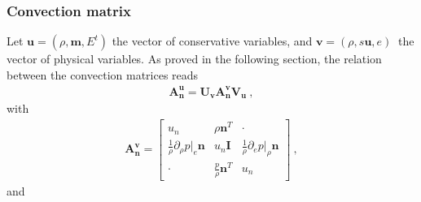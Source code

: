 \documentclass[letterpaper,10pt,english]{jupyterBook}
\begin{document}
\subsubsection*{Convection matrix}

\sphinxAtStartPar
Let \(\mathbf{u} = ( \rho, \mathbf{m}, E^t )\) the vector of conservative variables, and \(\mathbf{v} = ( \rho, s\mathbf{u} , e ) \ \) the vector of physical variables. As proved in the following section, the relation between the convection matrices reads
\begin{equation*}
\begin{split}\mathbf{A}_{\mathbf{n}}^{\mathbf{u}} = \mathbf{U}_{\mathbf{v}} \mathbf{A}_{\mathbf{n}}^{\mathbf{v}} \mathbf{V}_{\mathbf{u}} \ ,\end{split}
\end{equation*}
\sphinxAtStartPar
with
\begin{equation*}
\begin{split}\mathbf{A}_{\mathbf{n}}^{\mathbf{v}} = \begin{bmatrix} u_n & \rho \mathbf{n}^T & \cdot \\ \frac{1}{\rho}\partial_\rho p|_e \mathbf{n} & u_n \mathbf{I} & \frac{1}{\rho}\partial_e p|_{\rho} \mathbf{n} \\ \cdot & \frac{p}{\rho} \mathbf{n}^T & u_n \end{bmatrix} \ ,\end{split}
\end{equation*}
\sphinxAtStartPar
and
\end{document}
